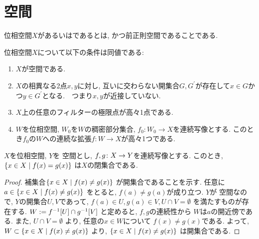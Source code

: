 \documentclass[uplatex, dvipdfmx, a4paper, 12pt, class=jsbook, crop=false]{standalone}
\begin{document}
\section{\Hausdorff 空間}
\label{sec:Hausdorff-spaces}

\begin{definition}
	位相空間$ X $があるいはであるとは, かつ前正則空間であることである.
\end{definition}

\begin{proposition}
	位相空間$ X $について以下の条件は同値である:
	\begin{enumerate}
		\item $ X $が空間である.
		\item $ X $の相異なる2点$ x, y $に対し, 互いに交わらない開集合$ G, G^\prime $が存在して$ x \in G$かつ$ y \in G^\prime $となる.　つまり$ x, y $が近接していない.
		\item $ X $上の任意のフィルターの極限点が高々1点である.
		\item $ W $を位相空間, $ W_0 $を$ W $の稠密部分集合, $ f_0 \colon W_0 \rightarrow X $を連続写像とする. このとき$ f_0 $の$ W $への連続な拡張$ f \colon W \rightarrow X$が高々1つである.
	\end{enumerate}
\end{proposition}

\begin{proposition}
	\label{h00001}
	\( X \)を位相空間, \( Y \)を \Hausdorff 空間とし,
	\( f,g\colon X\to Y \)を連続写像とする.
	このとき, \( \setcomp{x \in X}{f(x) = g(x)} \)
	は\( X \)の閉集合である.
\end{proposition}

\begin{proof}
	補集合\( \setcomp{x \in X}{f(x) \neq g(x)} \)
	が開集合であることを示す.
	任意に\( a \in \setcomp{x \in X}{f(x) \neq g(x)} \)
	をとると, \( f(a) \neq g(a) \)が成り立つ.
	\( Y \)が \Hausdorff 空間なので,
	\( Y \)の開集合\( U, V \)であって,
	\( f(a) \in U, g(a) \in V, U \cap V = \emptyset \)
	を満たすものが存在する.
	\( W \defeq \mapinvset{f}{U} \cap \mapinvset{g}{V} \)
	と定めると, \( f, g \)の連続性から
	\( W \)は\( a \)の開近傍である.
	また, \( U \cap V = \emptyset \)
	より, 任意の\( x \in W \)について
	\( f(x) \neq g(x) \)である.
	よって, \( W \subset \setcomp{x \in X}{f(x) \neq g(x)} \)
	より, \( \setcomp{x \in X}{f(x) \neq g(x)} \)
	は開集合である.
\end{proof}
\end{document}
